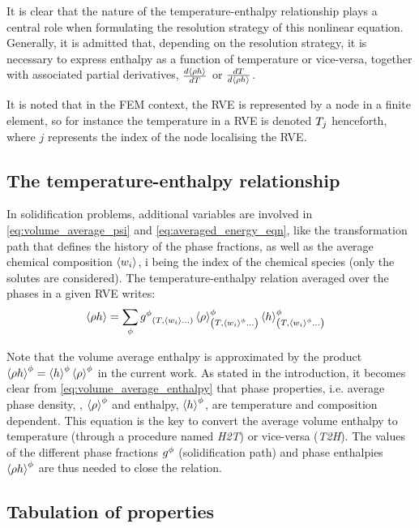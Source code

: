 It is clear that the nature of the temperature-enthalpy relationship plays a central 
role when formulating the resolution strategy of this nonlinear equation. Generally, it is admitted that, depending on the resolution strategy, 
it is necessary to express enthalpy as a function of temperature or vice-versa, together with associated partial derivatives, 
$\frac{d \left \langle  \rho h  \right \rangle}{dT}$ or $\frac{dT }{d \left \langle  \rho h  \right \rangle}$.

It is noted that in the FEM context, the RVE is represented by a node in a finite element, so for instance the temperature in a RVE
is denoted $T_j$ henceforth, where $j$ represents the index of the node localising the RVE.

\subsection{The temperature-enthalpy relationship} 

In solidification problems, additional variables are involved in \cref{eq:volume_average_psi} and \cref{eq:averaged_energy_eqn}, 
like the transformation path that defines the history of the phase fractions, as well as the average chemical composition $\left \langle w_i \right \rangle$, 
i being the index of the chemical species (only the solutes are considered). The temperature-enthalpy relation averaged over the 
phases in a given RVE writes:
\begin{align}
\label{eq:volume_average_enthalpy}
& \rh = \sum_\phi \gphi_{\brac{T, \wi \dots}} \rphi_{\brac{T, \wi^{\phi} \dots}} \hphi_{\brac{T, \wi^{\phi} \dots}}
\end{align}

Note that the volume average enthalpy is approximated by the product $\left \langle \rho h \right \rangle^{\phi}=\left \langle h \right \rangle^{\phi}  \left \langle \rho \right \rangle^{\phi} $ in the current work. As stated 
in the introduction, it becomes clear from \cref{eq:volume_average_enthalpy} that phase properties, i.e. average phase density, , $\left \langle \rho \right \rangle^{\phi} $ and enthalpy, $\left \langle h \right \rangle^{\phi} $, 
are temperature and composition dependent. This equation is the key to convert the average volume enthalpy to temperature (through a procedure named \emph{H2T}) 
or vice-versa (\emph{T2H}). The values of the different phase fractions ${g^{\phi}} $ (solidification path) and phase enthalpies $\left \langle  \rho h  \right \rangle^{\phi}$ are thus needed 
to close the relation.

\subsection{Tabulation of properties}

